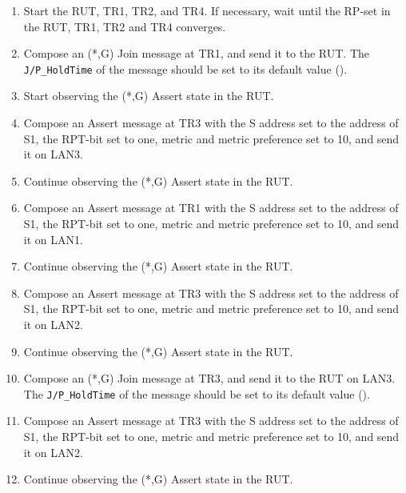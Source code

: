 \documentclass[11pt]{report}
\begin{document}
\begin{enumerate}

  \item Start the RUT, TR1, TR2, and TR4. If necessary, wait until the RP-set
  in the RUT, TR1, TR2 and TR4 converges.

  \item Compose an (*,G) Join message at TR1, and send it to the RUT.
  The \verb=J/P_HoldTime= of the message should be set to its default
  value ({\PimsmJPHoldTime}).

  \item Start observing the (*,G) Assert state in the RUT.

  \item Compose an Assert message at TR3 with the S address set to the
  address of S1, the RPT-bit set to one, metric and metric preference set to
  10, and send it on LAN3.

  \item Continue observing the (*,G) Assert state in the RUT.

  \item Compose an Assert message at TR1 with the S address set to the
  address of S1, the RPT-bit set to one, metric and metric preference set to
  10, and send it on LAN1.

  \item Continue observing the (*,G) Assert state in the RUT.

  \item Compose an Assert message at TR3 with the S address set to the
  address of S1, the RPT-bit set to one, metric and metric preference set to
  10, and send it on LAN2.

  \item Continue observing the (*,G) Assert state in the RUT.

  \item Compose an (*,G) Join message at TR3, and send it to the RUT on LAN3.
  The \verb=J/P_HoldTime= of the message should be set to its default
  value ({\PimsmJPHoldTime}).

  \item Compose an Assert message at TR3 with the S address set to the
  address of S1, the RPT-bit set to one, metric and metric preference set to
  10, and send it on LAN2.

  \item Continue observing the (*,G) Assert state in the RUT.

\end{enumerate}
\end{document}
